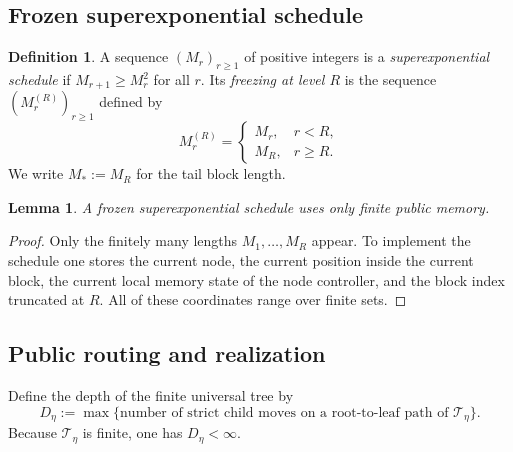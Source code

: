 \documentclass[12pt]{article}
\newtheorem{lemma}[theorem]{Lemma}
\theoremstyle{definition}
\newtheorem{definition}[theorem]{Definition}
\newcommand{\1}{\mathbf{1}}
\newcommand{\cT}{\mathcal{T}}
\begin{document}
\subsection{Frozen superexponential schedule}


\begin{definition}
A sequence $(M_r)_{r\ge 1}$ of positive integers is a
\emph{superexponential schedule} if $M_{r+1}\ge M_r^2$ for all $r$. Its
\emph{freezing at level $R$} is the sequence $(M_r^{(R)})_{r\ge 1}$ defined by
\[
M_r^{(R)}=
\begin{cases}
M_r, & r<R,\\
M_R, & r\ge R.
\end{cases}
\]
We write $M_*:=M_R$ for the tail block length.
\end{definition}

\begin{lemma}
\label{lem:frozen-memory}
A frozen superexponential schedule uses only finite public memory.
\end{lemma}

\begin{proof}
Only the finitely many lengths $M_1,\dots,M_R$ appear. To implement the schedule
one stores the current node, the current position inside the current block, the
current local memory state of the node controller, and the block index truncated at
$R$. All of these coordinates range over finite sets.
\end{proof}


\subsection{Public routing and realization}

Define the depth of the finite universal tree by
\[
D_\eta
:=
\max\{\text{number of strict child moves on a root-to-leaf path of }\cT_\eta\}.
\]
Because $\cT_\eta$ is finite, one has $D_\eta<\infty$.
\end{document}

